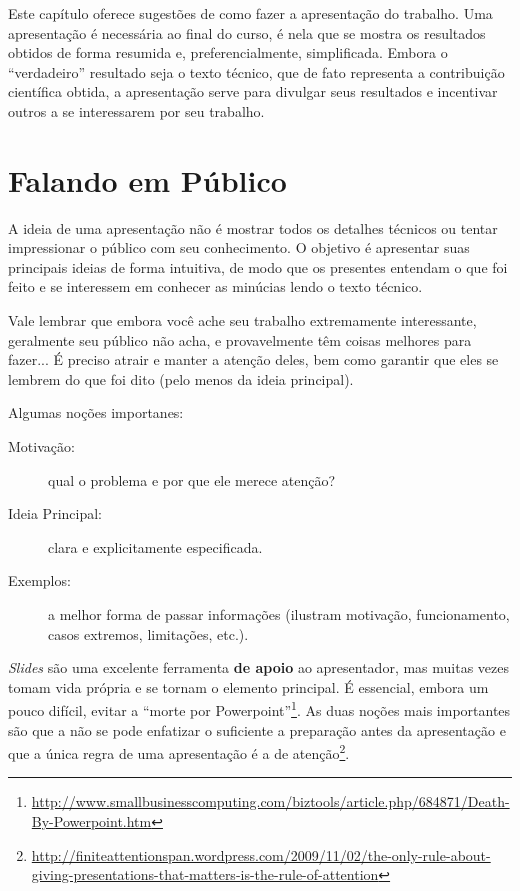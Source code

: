 Este capítulo oferece sugestões de como fazer a apresentação do trabalho. Uma 
apresentação é necessária ao final do curso, é nela que se mostra os resultados
obtidos de forma resumida e, preferencialmente, simplificada. Embora o ``verdadeiro''
resultado seja o texto técnico, que de fato representa a contribuição científica
obtida, a apresentação serve para divulgar seus resultados e incentivar outros a
se interessarem por seu trabalho.

\section{Falando em Público}
A ideia de uma apresentação não é mostrar todos os detalhes técnicos ou tentar
impressionar o público com seu conhecimento. O objetivo é apresentar suas principais
ideias de forma intuitiva, de modo que os presentes entendam o que foi feito e
se interessem em conhecer as minúcias lendo o texto técnico.

Vale lembrar que embora você ache seu trabalho extremamente interessante, 
geralmente seu público não acha, e provavelmente têm coisas melhores para fazer...
É preciso atrair e manter a atenção deles, bem como garantir que eles se lembrem
do que foi dito (pelo menos da ideia principal). 

Algumas noções importanes:
\begin{description}
\item[Motivação:] qual o problema e por que ele merece atenção?
\item[Ideia Principal:] clara e explicitamente especificada.
\item[Exemplos:] a melhor forma de passar informações (ilustram motivação, 
funcionamento, casos extremos, limitações, etc.).
\end{description}

\emph{Slides} são uma excelente ferramenta \textbf{de apoio} ao apresentador, mas
muitas vezes tomam vida própria e se tornam o elemento principal. É essencial, 
embora um pouco difícil,  evitar a ``morte por Powerpoint''\footnote{%
\url{http://www.smallbusinesscomputing.com/biztools/article.php/684871/Death-By-Powerpoint.htm}}. 
As duas noções mais importantes são que a não se pode enfatizar o suficiente
a preparação antes da apresentação e que a única regra de uma apresentação é a 
de atenção\footnote{\url{http://finiteattentionspan.wordpress.com/2009/11/02/the-only-rule-about-giving-presentations-that-matters-is-the-rule-of-attention}}.

